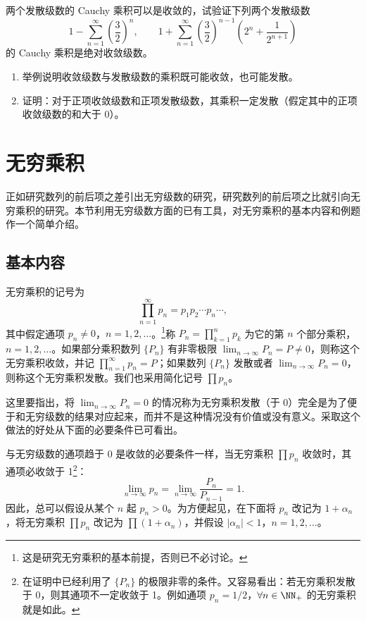 \begin{xexercise}[15]
两个发散级数的 Cauchy 乘积可以是收敛的，试验证下列两个发散级数
\[
1-\sum_{n=1}^{\infty}\left(\frac32\right)^n,
\qquad
1+\sum_{n=1}^{\infty}\left(\frac32\right)^{n-1}\left(2^n+\frac1{2^{n+1}}\right)
\]
的 Cauchy 乘积是绝对收敛级数。
\end{xexercise}

\begin{xexercise}[16]
\begin{enumerate}[label=(\arabic*)]
\item 举例说明收敛级数与发散级数的乘积既可能收敛，也可能发散。
\item 证明：对于正项收敛级数和正项发散级数，其乘积一定发散（假定其中的正项收敛级数的和大于 0）。
\end{enumerate}
\end{xexercise}

\section{无穷乘积}

正如研究数列的前后项之差引出无穷级数的研究，研究数列的前后项之比就引向无穷乘积的研究。本节利用无穷级数方面的已有工具，对无穷乘积的基本内容和例题作一个简单介绍。

\subsection{基本内容}

无穷乘积的记号为
\[
\prod_{n=1}^{\infty}p_n=p_1p_2\cdots p_n\cdots,
\]
其中假定通项 $p_n\neq0$，$n=1,2,\ldots$。\footnote{这是研究无穷乘积的基本前提，否则已不必讨论。}称 $P_n=\prod_{k=1}^{n}p_k$ 为它的第 $n$ 个部分乘积，$n=1,2,\ldots$。如果部分乘积数列 $\{P_n\}$ 有非零极限 $\lim_{n\to\infty}P_n=P\neq0$，则称这个无穷乘积收敛，并记 $\prod_{n=1}^{\infty}p_n=P$；如果数列 $\{P_n\}$ 发散或者 $\lim_{n\to\infty}P_n=0$，则称这个无穷乘积发散。我们也采用简化记号 $\prod p_n$。

这里要指出，将 $\lim_{n\to\infty}P_n=0$ 的情况称为无穷乘积发散（于 0）完全是为了便于和无穷级数的结果对应起来，而并不是这种情况没有价值或没有意义。采取这个做法的好处从下面的必要条件已可看出。

与无穷级数的通项趋于 0 是收敛的必要条件一样，当无穷乘积 $\prod p_n$ 收敛时，其通项必收敛于 1\footnote{在证明中已经利用了 $\{P_n\}$ 的极限非零的条件。又容易看出：若无穷乘积发散于 0，则其通项不一定收敛于 1。例如通项 $p_n=1/2$，$\forall n\in\NN_+$ 的无穷乘积就是如此。}：
\[
\lim_{n\to\infty}p_n=\lim_{n\to\infty}\frac{P_n}{P_{n-1}}=1.
\]
因此，总可以假设从某个 $n$ 起 $p_n>0$。为方便起见，在下面将 $p_n$ 改记为 $1+\alpha_n$，将无穷乘积 $\prod p_n$ 改记为 $\prod(1+\alpha_n)$，并假设 $|\alpha_n|<1$，$n=1,2,\ldots$。

